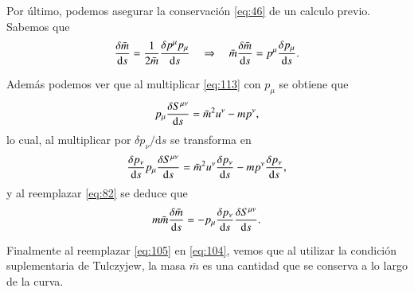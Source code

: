 Por último, podemos asegurar la conservación \eqref{eq:46} de un calculo previo. Sabemos que
\begin{equation}
\label{eq:104}
\frac{\delta \bar{m}}{\mathrm{d}s} = \frac{1}{2\bar{m}} \frac{\delta p^{\mu} p_{\mu}}{\mathrm{d}s} \quad \Rightarrow \quad \bar{m} \frac{\delta \bar{m}}{\mathrm{d}s} = p^{\mu} \frac{\delta p_{\mu}}{\mathrm{d}s}.
\end{equation}

Además podemos ver que al multiplicar \eqref{eq:113} con $p_{\mu}$ se obtiene que
\begin{equation}
p_{\mu} \frac{\delta S^{\mu \nu}}{\mathrm{d}s} = \bar{m}^2 u^{\nu} - m p^{\nu},
\end{equation}
lo cual, al multiplicar por $\delta p_{\nu} / \mathrm{d}s$ se transforma en
\begin{equation}
\frac{\delta p_{\nu}}{\mathrm{d}s} p_{\mu} \frac{\delta S^{\mu \nu}}{\mathrm{d}s} = \bar{m}^2 u^{\nu} \frac{\delta p_{\nu}}{\mathrm{d}s} - mp^{\nu} \frac{\delta p_{\nu}}{\mathrm{d}s},
\end{equation}
y al reemplazar \eqref{eq:82} se deduce que
\begin{equation}
\label{eq:105}
m \bar{m} \frac{\delta \bar{m}}{\mathrm{d}s} = - p_{\mu} \frac{\delta p_{\nu}}{\mathrm{d}s} \frac{\delta S^{\mu \nu}}{\mathrm{d}s}.
\end{equation}

Finalmente al reemplazar \eqref{eq:105} en \eqref{eq:104}, vemos que al utilizar la condición suplementaria de Tulczyjew, la masa $\bar{m}$ es una cantidad que se conserva a lo largo de la curva.